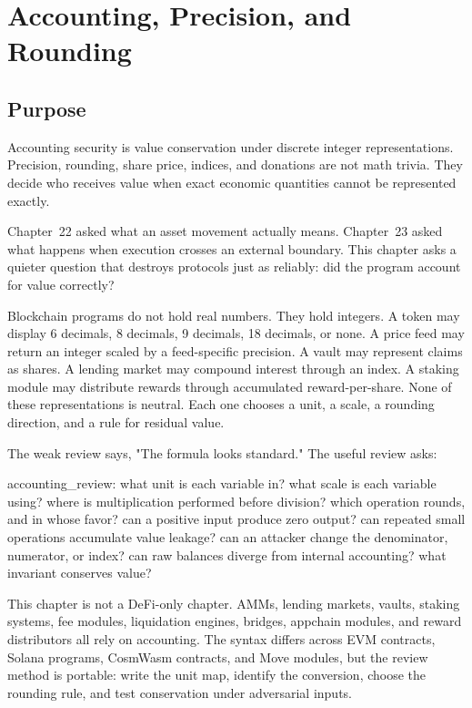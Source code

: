 \chapter{Accounting, Precision, and Rounding}

\section{Purpose}

\begin{principlebox}
Accounting security is value conservation under discrete integer representations. Precision, rounding, share price, indices, and donations are not math trivia. They decide who receives value when exact economic quantities cannot be represented exactly.
\end{principlebox}

Chapter~22 asked what an asset movement actually means. Chapter~23 asked what happens when execution crosses an external boundary. This chapter asks a quieter question that destroys protocols just as reliably: did the program account for value correctly?

Blockchain programs do not hold real numbers. They hold integers. A token may display 6 decimals, 8 decimals, 9 decimals, 18 decimals, or none. A price feed may return an integer scaled by a feed-specific precision. A vault may represent claims as shares. A lending market may compound interest through an index. A staking module may distribute rewards through accumulated reward-per-share. None of these representations is neutral. Each one chooses a unit, a scale, a rounding direction, and a rule for residual value.

The weak review says, "The formula looks standard." The useful review asks:

\begin{codeblock}
accounting_review:
    what unit is each variable in?
    what scale is each variable using?
    where is multiplication performed before division?
    which operation rounds, and in whose favor?
    can a positive input produce zero output?
    can repeated small operations accumulate value leakage?
    can an attacker change the denominator, numerator, or index?
    can raw balances diverge from internal accounting?
    what invariant conserves value?
\end{codeblock}

This chapter is not a DeFi-only chapter. AMMs, lending markets, vaults, staking systems, fee modules, liquidation engines, bridges, appchain modules, and reward distributors all rely on accounting. The syntax differs across EVM contracts, Solana programs, CosmWasm contracts, and Move modules, but the review method is portable: write the unit map, identify the conversion, choose the rounding rule, and test conservation under adversarial inputs.

